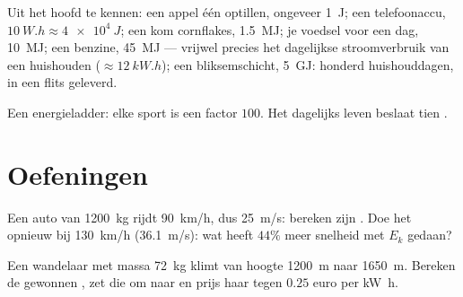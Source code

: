 \begin{example}[Ordegrootten]\label{ex:g10:energy-conservation:orders}
Uit het hoofd te kennen: een appel één  optillen, ongeveer
\qty{1}{J}; een telefoonaccu, $\qty{10}{W.h} \approx \qty{4e4}{J}$; een
kom cornflakes, \qty{1.5}{MJ}; je voedsel voor een dag, \qty{10}{MJ}; een
 benzine, \qty{45}{MJ} --- vrijwel precies het dagelijkse
stroomverbruik van een huishouden ($\approx \qty{12}{kW.h}$); een
bliksemschicht, \qty{5}{GJ}: honderd huishouddagen, in een flits
geleverd.
\end{example}

\begin{omfigure}

{\small Een energieladder: elke sport is een factor $100$. Het dagelijks
leven beslaat tien .}
\end{omfigure}

\section{Oefeningen}

\begin{exercise}[$\star$]\label{exo:g10:energy-conservation:1}
Een auto van \qty{1200}{kg} rijdt \qty{90}{km/h}, dus \qty{25}{m/s}:
bereken zijn . Doe het opnieuw bij \qty{130}{km/h}
(\qty{36.1}{m/s}): wat heeft $44\%$ meer snelheid met $E_k$ gedaan?
\end{exercise}

\begin{exercise}[$\star$]\label{exo:g10:energy-conservation:2}
Een wandelaar met massa \qty{72}{kg} klimt van hoogte \qty{1200}{m} naar
\qty{1650}{m}. Bereken de gewonnen , zet die om naar
 en prijs haar tegen $0.25$ euro per \unit{kW.h}.
\end{exercise}

